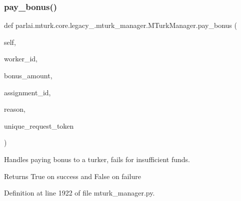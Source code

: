 \subsubsection{\texorpdfstring{pay\+\_\+bonus()}{pay\_bonus()}}
{\footnotesize\ttfamily def parlai.\+mturk.\+core.\+legacy\+\_.\+mturk\+\_\+manager.\+M\+Turk\+Manager.\+pay\+\_\+bonus (\begin{DoxyParamCaption}\item[{}]{self,  }\item[{}]{worker\+\_\+id,  }\item[{}]{bonus\+\_\+amount,  }\item[{}]{assignment\+\_\+id,  }\item[{}]{reason,  }\item[{}]{unique\+\_\+request\+\_\+token }\end{DoxyParamCaption})}

\begin{DoxyVerb}Handles paying bonus to a turker, fails for insufficient funds.

Returns True on success and False on failure
\end{DoxyVerb}
 

Definition at line 1922 of file mturk\+\_\+manager.\+py.


